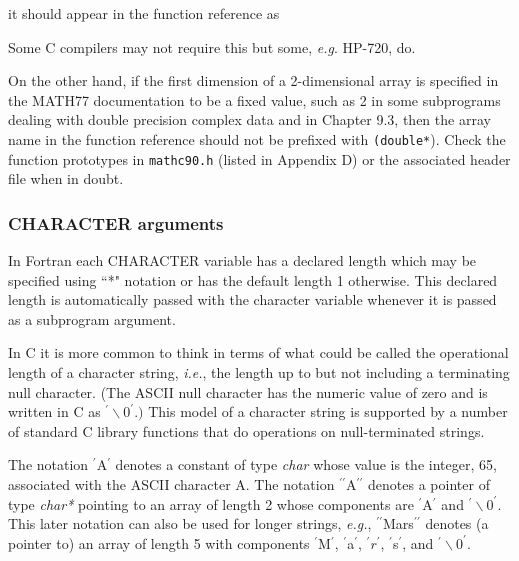\documentclass[twoside]{MATH77}
\begin{document}
\hspace{.2in}{\tt double a[10][5];}

it should appear in the function reference as

\hspace{.2in}{\tt(double*)a}

Some C compilers may not require this but some, {\em e.g}. HP-720,
do.\rule[-6pt]{0pt}{8pt}

On the other hand, if the first dimension of a 2-dimensional array is
specified in the MATH77 documentation to be a fixed value, such as 2 in some
subprograms dealing with double precision complex data and in Chapter 9.3,
then the array name in the function reference should not be prefixed with
{\tt(double*}). Check the function prototypes in {\tt mathc90.h}
(listed in Appendix D) or the associated header file when in doubt.

\subsubsection{CHARACTER arguments\label{chararg}}

\begin{minipage}{2.6in}
In Fortran each CHARACTER variable has a declared length which may be
specified using ``*" notation or has the default length 1 otherwise. This
declared length is automatically passed with the character variable whenever
it is passed as a subprogram argument.

In C it is more common to think in terms of what could be called the
operational length of a character string,
{\em i.e.}, the length up to but not
including a terminating null character. (The ASCII null character has the
numeric value of zero and is written in C as $^{\prime}\backslash
0^{\prime}.)$ This model of a character string is supported by a number of
standard C library functions that do operations on null-terminated strings.
\end{minipage}

The notation $^\prime $A$^\prime $ denotes a constant of type {\em
char} whose value is the integer, 65, associated with the ASCII
character A. The notation $^{\prime \prime } $A$^{\prime \prime } $
denotes a pointer of type {\em char*} pointing to an array of length
2 whose components are $^\prime $A$^\prime $ and $^{\prime}\backslash
0^{\prime}$. This later notation can also be used for longer strings,
{\em e.g.}, $^{\prime \prime }$Mars$^{\prime \prime }$ denotes
(a pointer to) an array of length 5 with components
$^{\prime}$M$^{\prime}$, $^\prime $a$^\prime $,
$^{\prime}r^{\prime}$, $^{\prime}$s$^{\prime}$, and
$^{\prime}\backslash 0^{\prime}.$
\end{document}
